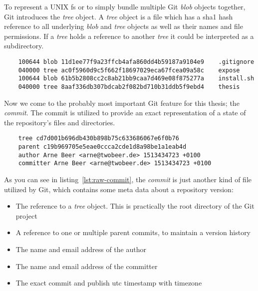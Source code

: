To represent a UNIX \ac{fs} or to simply bundle multiple Git \emph{blob} objects together, Git introduces the \emph{tree} object.
A \emph{tree} object is a file which has a \ac{sha1} hash reference to all underlying \emph{blob} and \emph{tree} objects as well as their names and file permissions.
If a \emph{tree} holds a reference to another \emph{tree} it could be interpreted as a subdirectory.

\begin{verbatim}
    100644 blob 11d1ee77f9a23ffcb4afa860dd4b59187a9104e9	.gitignore
    040000 tree ac0f5960d9c5f662f18697029eca67fcea09a58c	expose
    100644 blob 61b5b2808cc2c8ab21bb9caa7d469e08f875277a	install.sh
    040000 tree 8aaf336db307bdcab2f082bd710b31ddb5f9ebd4	thesis
\end{verbatim}
\begingroup
{}
\endgroup

Now we come to the probably most important Git feature for this thesis; the \emph{commit}.
The commit is utilized to provide an exact representation of a state of the repository's files and directories.

\begin{verbatim}
    tree cd7d001b696db430b898b75c633686067e6f0b76
    parent c19b969705e5eae0ccca2cde1d8a98be1a1eab4d
    author Arne Beer <arne@twobeer.de> 1513434723 +0100
    committer Arne Beer <arne@twobeer.de> 1513434723 +0100
\end{verbatim}
\begingroup
{}
\endgroup

As you can see in listing~\ref{lst:raw-commit}, the \emph{commit} is just another kind of file utilized by Git, which contains some meta data about a repository version:

\begin{itemize}
    \item The reference to a \emph{tree} object. This is practically the root directory of the Git project
    \item A reference to one or multiple parent commits, to maintain a version history
    \item The name and email address of the author
    \item The name and email address of the committer
    \item The exact commit and publish \ac{utc} timestamp with timezone
\end{itemize}

